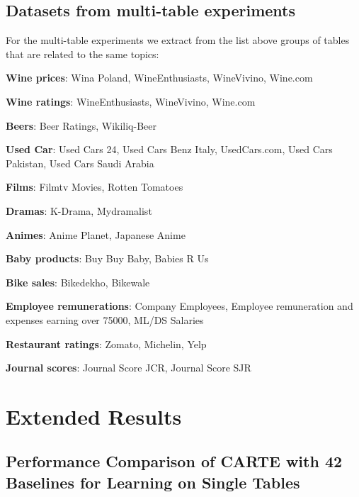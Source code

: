 \documentclass{article}
\theoremstyle{plain}
\theoremstyle{definition}
\theoremstyle{remark}
\begin{document}
\subsection{Datasets from multi-table experiments}\label{app:multitable}

For the multi-table experiments we extract from the list above groups of tables that are related to the same topics:
\begin{description}
    \item \textbf{Wine prices}: Wina Poland, WineEnthusiasts, WineVivino, Wine.com
    \item \textbf{Wine ratings}: WineEnthusiasts, WineVivino, Wine.com
    \item \textbf{Beers}: Beer Ratings, Wikiliq-Beer
    \item \textbf{Used Car}: Used Cars 24, Used Cars Benz Italy, UsedCars.com, Used Cars Pakistan, Used Cars Saudi Arabia
    \item \textbf{Films}: Filmtv Movies, Rotten Tomatoes
    \item \textbf{Dramas}: K-Drama, Mydramalist
    \item \textbf{Animes}: Anime Planet, Japanese Anime
    \item \textbf{Baby products}: Buy Buy Baby, Babies R Us
    \item \textbf{Bike sales}: Bikedekho, Bikewale
    \item \textbf{Employee remunerations}: Company Employees, Employee remuneration and expenses earning over 75000, ML/DS Salaries
    \item \textbf{Restaurant ratings}: Zomato, Michelin, Yelp
    \item \textbf{Journal scores}: Journal Score JCR, Journal Score SJR
\end{description}

\section{Extended Results}

\subsection{Performance Comparison of CARTE with 42 Baselines for Learning on Single Tables}\label{app:comparison_overall}
\end{document}
